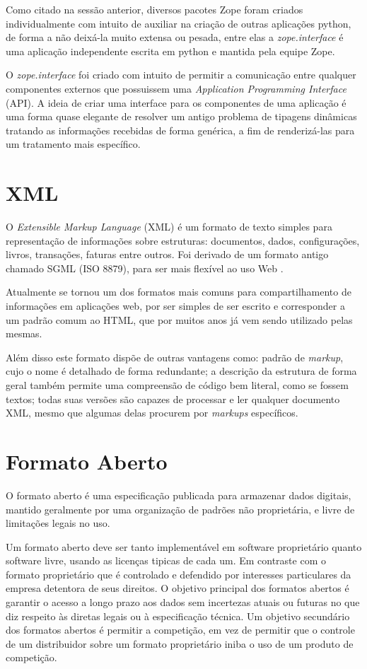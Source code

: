 Como citado na sessão anterior, diversos pacotes Zope foram criados individualmente com intuito de auxiliar na criação de outras aplicações python, de forma a não deixá-la muito extensa ou pesada, entre elas a \textit{zope.interface} é uma aplicação independente escrita em python e mantida pela equipe Zope.

O \textit{zope.interface} foi criado com intuito de permitir a comunicação entre qualquer componentes externos que possuissem uma \textit{Application Programming Interface} (API). A ideia de criar uma interface para os componentes de uma aplicação é uma forma quase elegante de resolver um antigo problema de tipagens dinâmicas tratando as informações recebidas de forma genérica, a fim de renderizá-las para um tratamento mais específico.

\section{XML}

O \textit{Extensible Markup Language} (XML) é um formato de texto simples para representação de informações sobre estruturas: documentos, dados, configurações, livros, transações, faturas entre outros. Foi derivado de um formato antigo chamado SGML (ISO 8879), para ser mais flexível ao uso Web \cite{W3C-XML}.

Atualmente se tornou um dos formatos mais comuns para compartilhamento de informações em aplicações web, por ser simples de ser escrito e corresponder a um padrão comum ao HTML, que por muitos anos já vem sendo utilizado pelas mesmas.

Além disso este formato dispõe de outras vantagens como: padrão de \textit{markup}, cujo o nome é detalhado de forma redundante; a descrição da estrutura de forma geral também permite uma compreensão de código bem literal, como se fossem textos; todas suas versões são capazes de processar e ler qualquer documento XML, mesmo que algumas delas procurem por \textit{markups} específicos.

\section{Formato Aberto}

O formato aberto é uma especificação publicada para armazenar dados digitais, mantido geralmente por uma organização de padrões não proprietária, e livre de limitações legais no uso.

Um formato aberto deve ser tanto implementável em software proprietário quanto software livre, usando as licenças tipicas de cada um. Em contraste com o formato proprietário que é controlado e defendido por interesses particulares da empresa detentora de seus direitos. O objetivo principal dos formatos abertos é garantir o acesso a longo prazo aos dados sem incertezas atuais ou futuras no que diz respeito às diretas legais ou à especificação técnica. Um objetivo secundário dos formatos abertos é permitir a competição, em vez de permitir que o controle de um distribuidor sobre um formato proprietário iniba o uso de um produto de competição.

